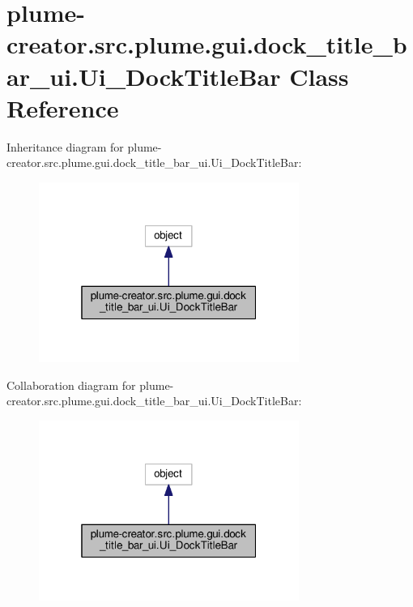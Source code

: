 \hypertarget{classplume-creator_1_1src_1_1plume_1_1gui_1_1dock__title__bar__ui_1_1_ui___dock_title_bar}{}\section{plume-\/creator.src.\+plume.\+gui.\+dock\+\_\+title\+\_\+bar\+\_\+ui.\+Ui\+\_\+\+Dock\+Title\+Bar Class Reference}
\label{classplume-creator_1_1src_1_1plume_1_1gui_1_1dock__title__bar__ui_1_1_ui___dock_title_bar}


Inheritance diagram for plume-\/creator.src.\+plume.\+gui.\+dock\+\_\+title\+\_\+bar\+\_\+ui.\+Ui\+\_\+\+Dock\+Title\+Bar\+:\nopagebreak
\begin{figure}[H]
\begin{center}
\leavevmode
\includegraphics[width=241pt]{classplume-creator_1_1src_1_1plume_1_1gui_1_1dock__title__bar__ui_1_1_ui___dock_title_bar__inherit__graph}
\end{center}
\end{figure}


Collaboration diagram for plume-\/creator.src.\+plume.\+gui.\+dock\+\_\+title\+\_\+bar\+\_\+ui.\+Ui\+\_\+\+Dock\+Title\+Bar\+:\nopagebreak
\begin{figure}[H]
\begin{center}
\leavevmode
\includegraphics[width=241pt]{classplume-creator_1_1src_1_1plume_1_1gui_1_1dock__title__bar__ui_1_1_ui___dock_title_bar__coll__graph}
\end{center}
\end{figure}
